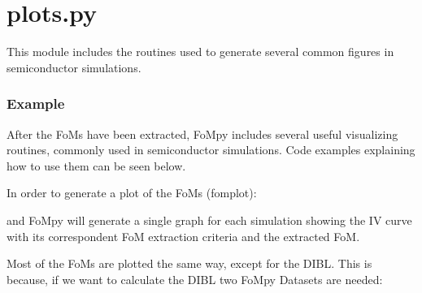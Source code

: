 \documentclass[letterpaper,10pt,english,openany, oneside]{sphinxmanual}
\begin{document}
\label{\detokenize{index:module-fompy.plots}}

\section{plots.py}
\label{\detokenize{index:plots-py}}
This module includes the routines used to generate several common figures
in semiconductor simulations.
\subsubsection*{Example}

After the FoMs have been extracted, FoMpy includes several useful visualizing routines,
commonly used in semiconductor simulations. Code examples explaining how to use them can be seen below.

In order to generate a plot of the FoMs (fomplot):

%
\begin{sphinxVerbatim}[commandchars=\\\{\}]
 
  
   
     
    
\end{sphinxVerbatim}

and FoMpy will generate a single graph for each simulation showing the IV curve with its correspondent FoM extraction criteria and the extracted FoM.

Most of the FoMs are plotted the same way, except for the DIBL. This is because, if we want to calculate the DIBL
two FoMpy Datasets are needed:
\end{document}

